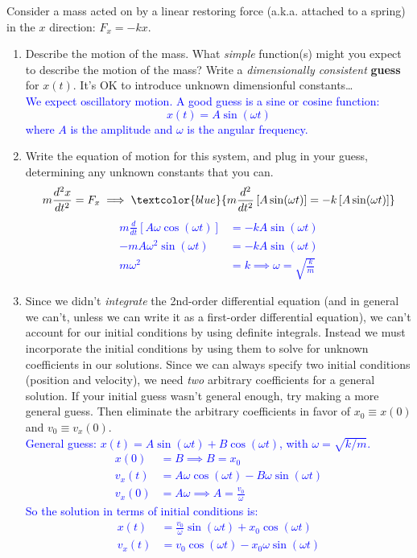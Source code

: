 \documentclass[11pt, letterpaper, openany]{book}
\newenvironment{exercise}[1][Exercise]{%
  \tcolorbox[blanker, breakable, left=1em,
    before skip=1em, after skip=1em,
    borderline west={3pt}{0pt}{PhysNavy},
    colback=PhysCream,
    before upper={\textcolor{PhysNavy}{\sffamily\bfseries #1:}\space}
  ]%
}{%
  \endtcolorbox%
}
\begin{document}
\begin{exercise}[Exercise 4]
Consider a mass acted on by a linear restoring force (a.k.a. attached to a spring) in the $x$ direction: $F_x = -kx$.
\begin{enumerate}[label=(\alph*)]
    \item Describe the motion of the mass. What \textit{simple} function(s) might you expect to describe the motion of the mass? Write a \textit{dimensionally consistent} \textbf{guess} for $x(t)$. It's OK to introduce unknown dimensionful constants\dots \\
    \textcolor{blue}{We expect oscillatory motion. A good guess is a sine or cosine function:
    \[ x(t) = A\sin(\omega t) \]
    where $A$ is the amplitude and $\omega$ is the angular frequency.}
    
    \item Write the equation of motion for this system, and plug in your guess, determining any unknown constants that you can.
    \[ m\frac{d^2x}{dt^2} = F_x \implies \textcolor{blue}{m\frac{d^2}{dt^2}\left[ A\sin(\omega t) \right] = -k\left[ A\sin(\omega t) \right]} \]
    \textcolor{blue}{
    \begin{align*}
        m\frac{d}{dt}\left[ A\omega\cos(\omega t) \right] &= -kA\sin(\omega t) \\
        -mA\omega^2\sin(\omega t) &= -kA\sin(\omega t) \\
        m\omega^2 &= k \implies \omega = \sqrt{\frac{k}{m}}
    \end{align*}
    }
    
    \item Since we didn't \textit{integrate} the 2nd-order differential equation (and in general we can't, unless we can write it as a first-order differential equation), we can't account for our initial conditions by using definite integrals. Instead we must incorporate the initial conditions by using them to solve for unknown coefficients in our solutions. Since we can always specify two initial conditions (position and velocity), we need \textit{two} arbitrary coefficients for a general solution. If your initial guess wasn't general enough, try making a more general guess. Then eliminate the arbitrary coefficients in favor of $x_0 \equiv x(0)$ and $v_0 \equiv v_x(0)$. \\
    \textcolor{blue}{
    General guess: $x(t) = A\sin(\omega t) + B\cos(\omega t)$, with $\omega = \sqrt{k/m}$.
    \begin{align*}
        x(0) &= B \implies B = x_0 \\
        v_x(t) &= A\omega\cos(\omega t) - B\omega\sin(\omega t) \\
        v_x(0) &= A\omega \implies A = \frac{v_0}{\omega}
    \end{align*}
    So the solution in terms of initial conditions is:
    \begin{align*}
        x(t) &= \frac{v_0}{\omega}\sin(\omega t) + x_0\cos(\omega t) \\
        v_x(t) &= v_0\cos(\omega t) - x_0\omega\sin(\omega t)
    \end{align*}
    }
    

\end{enumerate}
\end{exercise}
\end{document}
